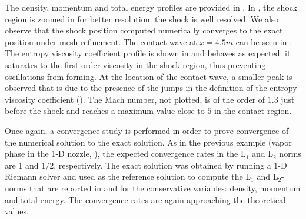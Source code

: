 %
The density, momentum and total energy profiles are provided in . In , the shock region is zoomed in for better resolution: the shock is well resolved. We also observe that the shock position computed numerically converges to the exact position under mesh refinement. The contact wave at $x=4.5m$ can be seen in . The entropy viscosity coefficient profile is shown in  and behaves as expected: it saturates to the first-order viscosity in the shock region, thus preventing oscillations from forming. At the location of the contact wave, a smaller peak is observed that is due to the presence of the jumps in the definition of the entropy viscosity coefficient ().  The Mach number, not plotted, is of the order of $1.3$ just before the shock and reaches a maximum value close to $5$ in the contact region.

Once again, a convergence study is performed in order to prove convergence of the numerical solution to the exact solution. As in the previous example (vapor phase in the 1-D nozzle, ), the expected convergence rates in the L$_1$ and L$_2$ norms are 1 and $1/2$, respectively. The exact solution was obtained by running a 1-D Riemann solver and used as the reference solution to compute the L$_1$ and L$_2$-norms that are reported in  and  for the conservative variables: density, momentum and total energy. The convergence rates are again approaching the theoretical values.

